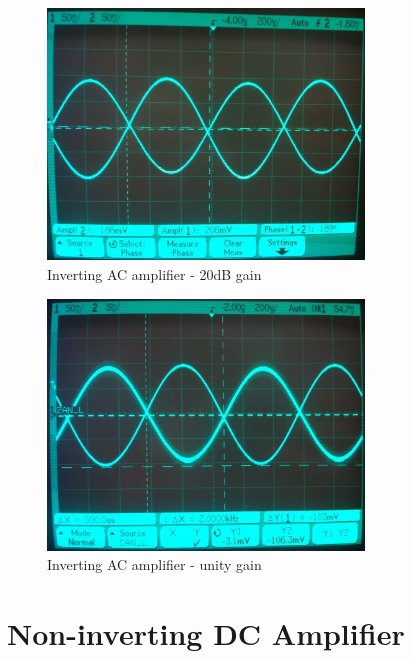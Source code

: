 \documentclass[11pt,a4paper]{article}
\begin{document}
\begin{figure}[htbp]
    \centering
    \includegraphics[width=0.75\textwidth]{img/invACamp-x10.jpg}
    \caption{Inverting AC amplifier - 20dB gain}
    \label{fig:invACamp20dB_scope}
\end{figure}

\begin{figure}[htbp]
    \centering
    \includegraphics[width=0.75\textwidth]{img/invACamp-x1.jpg}
    \caption{Inverting AC amplifier - unity gain}
    \label{fig:invACampunity_scope}
\end{figure}


\section{Non-inverting DC Amplifier}\label{non-inverting-dc-amplifier}
\end{document}

